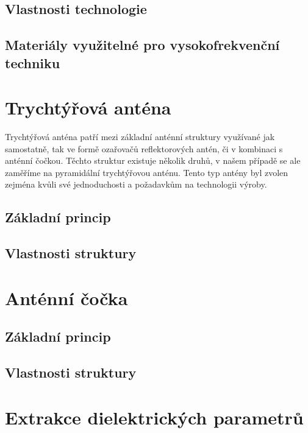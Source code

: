 \subsection{Vlastnosti technologie}


\subsection{Materiály využitelné pro vysokofrekvenční techniku}


\section{Trychtýřová anténa}
Trychtýřová anténa patří mezi základní anténní struktury využívané jak samostatně, tak ve formě ozařovačů reflektorových antén, či v kombinaci s anténní čočkou. Těchto struktur existuje několik druhů, v našem případě se ale zaměříme na pyramidální trychtýřovou anténu.
Tento typ antény byl zvolen zejména kvůli své jednoduchosti a požadavkům na technologii výroby.

\subsection{Základní princip}
\subsection{Vlastnosti struktury}


\section{Anténní čočka}

\subsection{Základní princip}
\subsection{Vlastnosti struktury}




\section{Extrakce dielektrických parametrů}